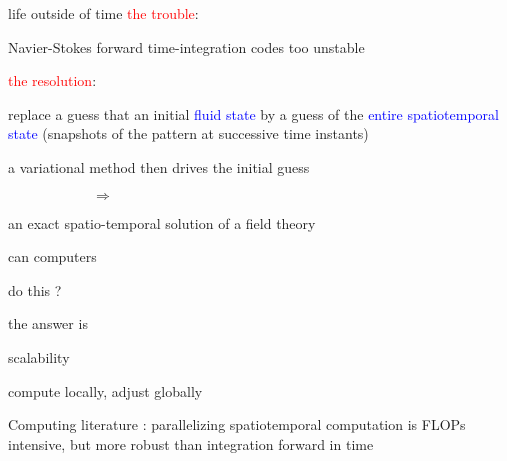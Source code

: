 \begin{frame}{life outside of time}
\textcolor{red}{the trouble}:

Navier-Stokes forward time-integration codes too unstable

\bigskip
\bigskip

\textcolor{red}{the resolution}:

 replace a guess that an initial  \textcolor{blue}{fluid state}
 by a guess of the \textcolor{blue}{entire spatiotemporal state}
 (snapshots of the pattern at successive time instants)%


\bigskip

a variational method
then drives the initial guess

\bigskip

$\qquad\qquad\qquad\Rightarrow$

\bigskip

an exact spatio-temporal  solution of a field theory
\end{frame}

\begin{frame}{can computers}

\vfill

{\Huge
do this ?
                  }

\vfill

\end{frame}


\begin{frame}{the answer is}

\vfill

{\Huge
scalability
                  }

\vfill

\end{frame}


\begin{frame}{compute locally, adjust globally}

Computing literature : parallelizing {\color{red}spatiotemporal}
computation is FLOPs intensive, but more robust than
integration forward in time
\end{frame}

